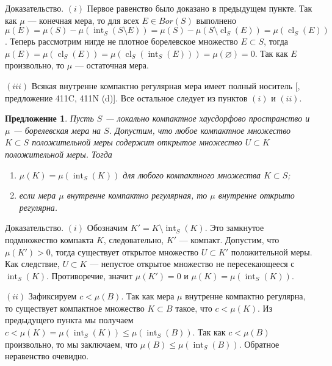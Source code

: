\documentclass[12pt]{article}
\numberwithin{equation}{subsection}
\theoremstyle{plain}
\newtheorem{proposition}{Предложение}
\newenvironment{proof}{Доказательство.}{}
\begin{document}
\begin{fulltext}
\begin{proof}
        $(i)$ Первое равенство было доказано в предыдущем пункте. Так как $\mu$
        --- конечная мера, то для всех $E\in Bor(S)$ выполнено
        $\mu(E)=\mu(S)-\mu(\operatorname{int}_S(S\setminus E))
            =\mu(S)-\mu(S\setminus\operatorname{cl}_S(E))
            =\mu(\operatorname{cl}_S(E))$. Теперь рассмотрим
        нигде не плотное борелевское множество $E\subset S$, тогда
        $\mu(E)=\mu(\operatorname{cl}_S(E))
            =\mu(\operatorname{cl}_S(\operatorname{int}_S(E)))
            =\mu(\varnothing)=0$.
        Так как $E$ произвольно, то $\mu$ --- остаточная мера.

        $(iii)$ Всякая внутренне компактно регулярная мера имеет полный носитель
        [\cite{FremMeasTh4.1}, предложение 411C, 411N (d)]. Все остальное
        следует из пунктов $(i)$ и $(ii)$.
    \end{proof}

    \begin{proposition}\label{NormalMeasCharac} Пусть $S$ --- локально
        компактное хаусдорфово пространство и $\mu$ --- борелевская мера на $S$.
        Допустим, что любое компактное множество $K\subset S$ положительной меры
        содержит открытое множество $U\subset K$ положительной меры. Тогда

        \begin{enumerate}[label = (\roman*)]
            \item $\mu(K)=\mu(\operatorname{int}_S(K))$ для любого компактного
                  множества $K\subset S$;

            \item если мера $\mu$ внутренне компактно регулярная, то $\mu$
                  внутренне открыто регулярна.
        \end{enumerate}
    \end{proposition}
    \begin{proof} $(i)$ Обозначим $K'=K\setminus \operatorname{int}_S(K)$. Это
        замкнутое подмножество компакта $K$, следовательно, $K'$ --- компакт.
        Допустим, что $\mu(K')>0$, тогда существует открытое множество $U\subset
            K'$ положительной меры. Как следствие, $U\subset K$ --- непустое
        открытое множество не пересекающееся с $\operatorname{int}_S(K)$.
        Противоречие, значит $\mu(K')=0$ и
        $\mu(K)=\mu(\operatorname{int}_S(K))$.

        $(ii)$ Зафиксируем $c<\mu(B)$. Так как мера $\mu$ внутренне компактно
        регулярна, то существует компактное множество $K\subset B$ такое, что
        $c<\mu(K)$. Из предыдущего пункта мы получаем
        $c<\mu(K)=\mu(\operatorname{int}_S(K))\leq\mu(\operatorname{int}_S(B))$.
        Так как $c<\mu(B)$ произвольно, то мы заключаем, что
        $\mu(B)\leq\mu(\operatorname{int}_S(B))$. Обратное неравенство очевидно.
    \end{proof}


\end{fulltext}
\end{document}

